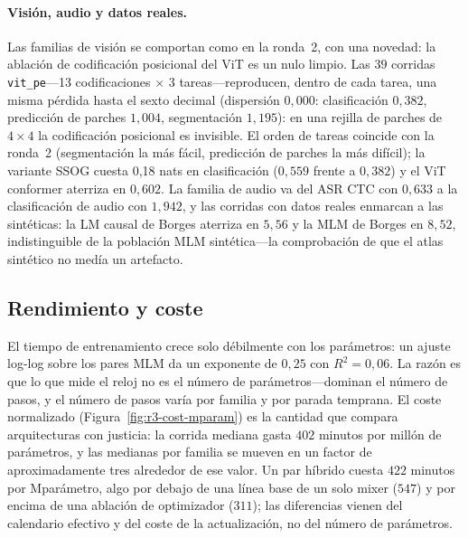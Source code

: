 \paragraph{Visión, audio y datos reales.}
Las familias de visión se comportan como en la ronda~2, con una novedad: la ablación de codificación posicional del ViT es un nulo limpio. Las $39$ corridas \texttt{vit\_pe}---13 codificaciones $\times$ 3 tareas---reproducen, dentro de cada tarea, una misma pérdida hasta el sexto decimal (dispersión $0,000$: clasificación $0,382$, predicción de parches $1,004$, segmentación $1,195$): en una rejilla de parches de $4\times4$ la codificación posicional es invisible. El orden de tareas coincide con la ronda~2 (segmentación la más fácil, predicción de parches la más difícil); la variante SSOG cuesta 0,18 nats en clasificación ($0,559$ frente a $0,382$) y el ViT conformer aterriza en $0,602$. La familia de audio va del ASR CTC con $0,633$ a la clasificación de audio con $1,942$, y las corridas con datos reales enmarcan a las sintéticas: la LM causal de Borges aterriza en $5,56$ y la MLM de Borges en $8,52$, indistinguible de la población MLM sintética---la comprobación de que el atlas sintético no medía un artefacto.

\subsection{Rendimiento y coste}

El tiempo de entrenamiento crece solo débilmente con los parámetros: un ajuste log-log sobre los pares MLM da un exponente de $0,25$ con $R^2=0,06$. La razón es que lo que mide el reloj no es el número de parámetros---dominan el número de pasos, y el número de pasos varía por familia y por parada temprana. El coste normalizado (Figura~\ref{fig:r3-cost-mparam}) es la cantidad que compara arquitecturas con justicia: la corrida mediana gasta $402$ minutos por millón de parámetros, y las medianas por familia se mueven en un factor de aproximadamente tres alrededor de ese valor. Un par híbrido cuesta $422$ minutos por Mparámetro, algo por debajo de una línea base de un solo mixer ($547$) y por encima de una ablación de optimizador ($311$); las diferencias vienen del calendario efectivo y del coste de la actualización, no del número de parámetros.

